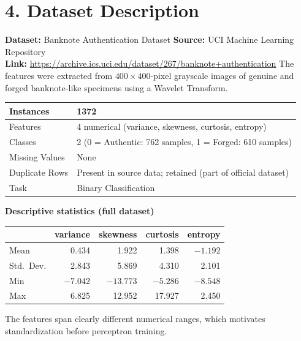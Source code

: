 \documentclass[11pt]{article}
\begin{document}
\section*{4. Dataset Description}
\textbf{Dataset:} Banknote Authentication Dataset\quad
\textbf{Source:} UCI Machine Learning Repository\\
\textbf{Link:} \url{https://archive.ics.uci.edu/dataset/267/banknote+authentication}
The features were extracted from $400\times400$-pixel grayscale images of genuine and forged banknote-like specimens using a Wavelet Transform.
\begin{center}
\begin{tabular}{|l|l|}
\hline
Instances & 1372\\ \hline
Features & 4 numerical (variance, skewness, curtosis, entropy)\\ \hline
Classes & 2 (0 = Authentic: 762 samples, 1 = Forged: 610 samples)\\ \hline
Missing Values & None\\ \hline
Duplicate Rows & Present in source data; retained (part of official dataset)\\ \hline
Task & Binary Classification\\ \hline
\end{tabular}
\end{center}
\textbf{Descriptive statistics (full dataset)}
\begin{center}
\begin{tabular}{|l|r|r|r|r|}
\hline
 & \textbf{variance} & \textbf{skewness} & \textbf{curtosis} & \textbf{entropy}\\ \hline
Mean & 0.434 & 1.922 & 1.398 & $-1.192$\\ \hline
Std.\ Dev. & 2.843 & 5.869 & 4.310 & 2.101\\ \hline
Min & $-7.042$ & $-13.773$ & $-5.286$ & $-8.548$\\ \hline
Max & 6.825 & 12.952 & 17.927 & 2.450\\ \hline
\end{tabular}
\end{center}
The features span clearly different numerical ranges, which motivates standardization before perceptron training.
\end{document}
